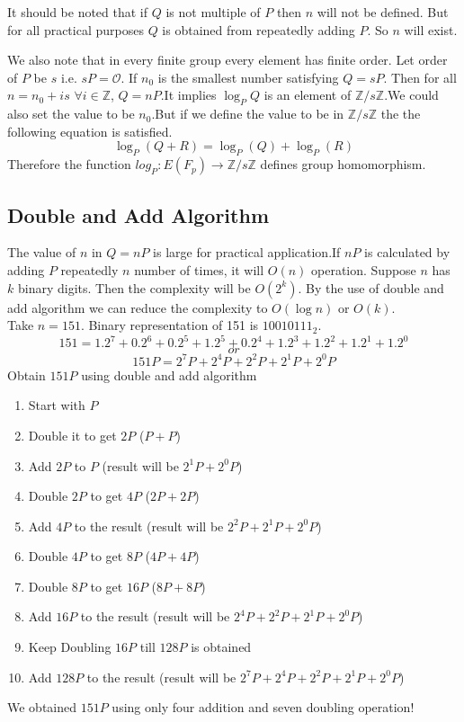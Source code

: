 \documentclass[a4paper,12pt]{report}
\begin{document}
It should be noted that if $Q$ is not multiple of $P$ then $n$ will not be defined. But for all practical purposes $Q$ is obtained from repeatedly adding $P$. So $n$ will exist.

We also note that in every finite group every element has finite order. Let order of $P$ be $s$ i.e. $s P=\mathscr{O}$. If $n_0$ is the smallest number satisfying $Q=sP$. Then for all $n=n_0+is$ $ \forall i \in \mathbb{Z} $, $Q=nP$.It implies $\log_P Q$ is an element of  $\mathbb{Z}/s\mathbb{Z}$.We could also set the value to be $n_0$.But if we define the value to be in $\mathbb{Z}/s\mathbb{Z}$ the the following equation is satisfied.
$$\log_P(Q+R)=\log_P(Q)+\log_P(R)$$
Therefore the function
$log_P:E(F_p)\rightarrow \mathbb{Z}/s\mathbb{Z}$ defines group homomorphism.
\subsection{Double and Add Algorithm}
The value of $n$ in $Q=nP$ is large for practical application.If $nP$ is calculated by adding $P$ repeatedly $n$ number of times, it will $O(n)$ operation. Suppose $n$ has $k$ binary digits. Then the complexity will be $O(2^k)$. By the use of double and add algorithm we can reduce the complexity to $O(\log {n})$ or $O(k)$.\\
Take $n=151$. Binary representation of 151 is $10010111_2$.
$$151=1.2^7+0.2^6+0.2^5+1.2^5+0.2^4+1.2^3+1.2^2+1.2^1+1.2^0$$
$$or$$
$$151P = 2^7P+2^4P+2^2P+2^1P+2^0P$$
Obtain $151P$ using double and add algorithm
\begin{enumerate}
	\item Start with $P$
	\item Double it to get $2P$ ($P+P$)
	\item Add $2P$ to $P$ (result will be $2^1P+2^0P$)
	\item Double $2P$ to get $4P$ ($2P+2P$)
	\item Add $4P$ to the result (result will be $2^2P+2^1P+2^0P$)
	\item Double $4P$ to get $8P$ ($4P+4P$)
	\item Double $8P$ to get $16P$ ($8P+8P$)
	\item Add $16P$ to the result (result will be $2^4P+2^2P+2^1P+2^0P$)
	\item Keep Doubling $16P$ till $128P$ is obtained
	\item Add $128P$ to the result (result will be $2^7P+2^4P+2^2P+2^1P+2^0P$)
\end{enumerate}
We obtained $151P$ using only four addition and seven doubling operation!
\end{document}
